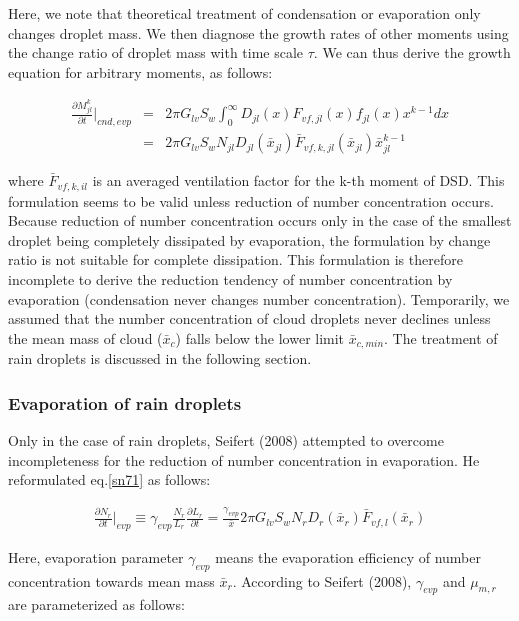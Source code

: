 Here, we note that theoretical treatment of condensation or evaporation only changes droplet mass. We then diagnose the growth rates of other moments using the change ratio of droplet mass with time scale $\tau$. We can thus derive the growth equation for arbitrary moments, as follows:

\begin{eqnarray}
\frac{\partial M_{jl}^{k}}{\partial t}\Bigr|_{cnd,evp}&=&2\pi G_{lv}S_{w}\int_{0}^{\infty}D_{jl}(x)F_{vf,jl}(x)f_{jl}(x)x^{k-1}dx\nonumber\\
&=&2\pi G_{lv}S_{w}N_{jl}D_{jl}(\bar{x}_{jl})\bar{F}_{vf,k,jl}(\bar{x}_{jl})\bar{x}_{jl}^{k-1}\label{sn71}
\end{eqnarray}

where $\bar{F}_{vf,k,il}$ is an averaged ventilation factor for the k-th moment of DSD. This formulation seems to be valid unless reduction of number concentration occurs. Because reduction of number concentration occurs only in the case of the smallest droplet being completely dissipated by evaporation, the formulation by change ratio is not suitable for complete dissipation. This formulation is therefore incomplete to derive the reduction tendency of number concentration by evaporation (condensation never changes number concentration). Temporarily, we assumed that the number concentration of cloud droplets never declines unless the mean mass of cloud ($\bar{x}_{c}$) falls below the lower limit $\bar{x}_{c,min}$. The treatment of rain droplets is discussed in the following section.


\subsubsection{Evaporation of rain droplets}
Only in the case of rain droplets, Seifert (2008) attempted to overcome incompleteness for the reduction of number concentration in evaporation. He reformulated eq.\ref{sn71} as follows:

\begin{eqnarray}
\frac{\partial N_{r}}{\partial t}\Bigr|_{evp}\equiv \gamma_{evp}\frac{N_{r}}{L_{r}}\frac{\partial L_{r}}{\partial t}=\frac{\gamma_{evp}}{\bar{x}}2\pi G_{lv}S_{w}N_{r}D_{r}(\bar{x}_{r})\bar{F}_{vf,l}(\bar{x}_{r})\label{sn72}
\end{eqnarray}

Here, evaporation parameter $\gamma_{evp}$ means the evaporation efficiency of number concentration towards mean mass $\bar{x}_{r}$. According to Seifert (2008), $\gamma_{evp}$ and $\mu_{m,r}$ are parameterized as follows:

